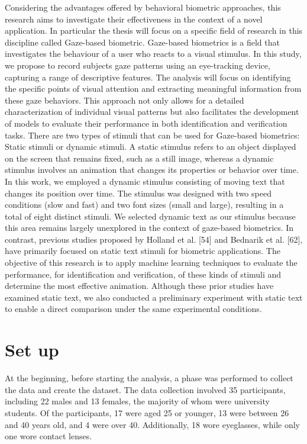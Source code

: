 \documentclass[12pt]{report}
\begin{document}
Considering the advantages offered by behavioral biometric approaches, this research aims to investigate their effectiveness in the context of a novel application.
In particular the thesis will focus on a specific field of research in this discipline called Gaze-based biometric.
Gaze-based biometrics is a field that investigates the behaviour of a user who reacts to a visual stimulus.
In this study, we propose to record subjects gaze patterns using an eye-tracking device, capturing a range of descriptive features.
The analysis will focus on identifying the specific points of visual attention and extracting meaningful information from these gaze behaviors.
This approach not only allows for a detailed characterization of individual visual patterns but also facilitates the development of models to evaluate their performance in both identification and verification tasks.
There are two types of stimuli that can be used for Gaze-based biometrics: Static stimuli or dynamic stimuli.
A static stimulus refers to an object displayed on the screen that remains fixed, such as a still image, whereas a dynamic stimulus involves an animation that changes its properties or behavior over time.
In this work, we employed a dynamic stimulus consisting of moving text that changes its position over time.
The stimulus was designed with two speed conditions (slow and fast) and two font sizes (small and large), resulting in a total of eight distinct stimuli.
We selected dynamic text as our stimulus because this area remains largely unexplored in the context of gaze-based biometrics.
In contrast, previous studies proposed by Holland et al. [54] and Bednarik et al. [62], have primarily focused on static text stimuli for biometric applications.
The objective of this research is to apply machine learning techniques to evaluate the performance, for identification and verification, of these kinds of stimuli and determine the most effective animation. 
Although these prior studies have examined static text, we also conducted a preliminary experiment with static text to enable a direct comparison under the same experimental conditions.

\section{Set up}
At the beginning, before starting the analysis, a phase was performed to collect the data and create the dataset.
The data collection involved 35 participants, including 22 males and 13 females, the majority of whom were university students.
Of the participants, 17 were aged 25 or younger, 13 were between 26 and 40 years old, and 4 were over 40. 
Additionally, 18 wore eyeglasses, while only one wore contact lenses.
\end{document}

